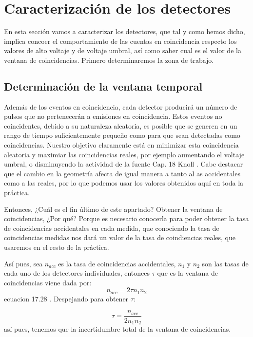 \documentclass[11pt]{article}
\begin{document}
\section{Caracterización de los detectores}

En esta sección vamos a caracterizar los detectores, que tal y como hemos dicho, implica concoer el comportamiento de las cuentas en coincidencia respecto los valores de alto voltaje y de voltaje umbral, así como saber cual es el valor de la ventana de coincidencias. Primero determinaremos la zona de trabajo.



\subsection{Determinación de la ventana temporal} \label{Subsec:ventana_temporal}

Además de los eventos en coincidencia, cada detector producirá un número de pulsos que no pertenecerán a emisiones en coincidencia. Estos eventos no coincidentes, debido a su naturaleza aleatoria, es posible que se generen en un rango de tiempo suficientemente pequeño como para que sean detectadas como coincidencias. Nuestro objetivo claramente está en minimizar esta coincidencia aleatoria y maximiar las coincidencias reales, por ejemplo aumentando el voltaje umbral, o disminuyendo la actividad de la fuente Cap. 18 Knoll \cite{Knoll:1300754}. Cabe destacar que el cambio en la geometría afecta de igual manera a tanto al as accidentales como a las reales, por lo que podemos usar los valores obtenidos aquí en toda la práctica.

Entonces, ¿Cuál es el fin último de este apartado? Obtener la ventana de coincidencias, ¿Por qué? Porque es necesario conocerla para poder obtener la tasa de coincidencias accidentales en cada medida, que conociendo la tasa de coincidencias medidas nos dará un valor de la tasa de coindiencias reales, que usaremos en el resto de la práctica.

Así pues, sea $n_{acc}$ es la tasa de coincidencias accidentales, $n_1$ y $n_2$ son las tasas de cada uno de los detectores individuales, entonces $\tau$ que es la ventana de coincidencias viene dada por:
\begin{equation}
	n_{acc} = 2 \tau  n_1 n_2
\end{equation}
ecuacion 17.28 \cite{Knoll:1300754}. Despejando para obtener $\tau$:

\begin{equation}
	\tau = \frac{n_{acc}}{2 n_1 n_2}
\end{equation}
así pues, tenemos que la incertidumbre total de la ventana de coincidencias.
\end{document}
